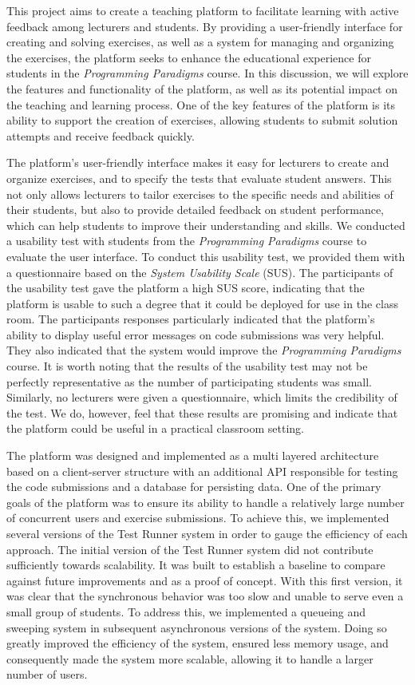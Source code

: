 This project aims to create a teaching platform to facilitate learning with active feedback among lecturers and students.
By providing a user-friendly interface for creating and solving exercises, as well as a system for managing and organizing the exercises, the platform seeks to enhance the educational experience for students in the \textit{Programming Paradigms} course.
In this discussion, we will explore the features and functionality of the platform, as well as its potential impact on the teaching and learning process.
One of the key features of the platform is its ability to support the creation of exercises, allowing students to submit solution attempts and receive feedback quickly.

The platform's user-friendly interface makes it easy for lecturers to create and organize exercises, and to specify the tests that evaluate student answers. This not only allows lecturers to tailor exercises to the specific needs and abilities of their students, but also to provide detailed feedback on student performance, which can help students to improve their understanding and skills.
We conducted a usability test with students from the \textit{Programming Paradigms} course to evaluate the user interface.
To conduct this usability test, we provided them with a questionnaire based on the \textit{System Usability Scale} (SUS).
The participants of the usability test gave the platform a high SUS score, indicating that the platform is usable to such a degree that it could be deployed for use in the class room. The participants responses particularly indicated that the platform's ability to display useful error messages on code submissions was very helpful.
They also indicated that the system would improve the \textit{Programming Paradigms} course.
It is worth noting that the results of the usability test may not be perfectly representative as the number of participating students was small.
Similarly, no lecturers were given a questionnaire, which limits the credibility of the test.
We do, however, feel that these results are promising and indicate that the platform could be useful in a practical classroom setting.

The platform was designed and implemented as a multi layered architecture based on a client-server structure with an additional API responsible for testing the code submissions and a database for persisting data.
One of the primary goals of the platform was to ensure its ability to handle a relatively large number of concurrent users and exercise submissions.
To achieve this, we implemented several versions of the Test Runner system in order to gauge the efficiency of each approach.
The initial version of the Test Runner system did not contribute sufficiently towards scalability.
It was built to establish a baseline to compare against future improvements and as a proof of concept. With this first version, it was clear that the synchronous behavior was too slow and unable to serve even a small group of students.
To address this, we implemented a queueing and sweeping system in subsequent asynchronous versions of the system. Doing so greatly improved the efficiency of the system, ensured less memory usage, and consequently made the system more scalable, allowing it to handle a larger number of users.

